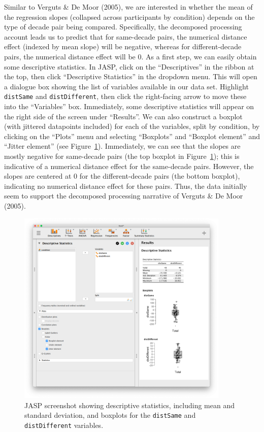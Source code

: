 \documentclass[english,,doc,floatsintext]{apa6}
\begin{document}
Similar to Verguts \& De Moor (2005), we are interested in whether the mean of the regression slopes (collapsed across participants by condition) depends on the type of decade pair being compared. Specifically, the decomposed processing account leads us to predict that for same-decade pairs, the numerical distance effect (indexed by mean slope) will be negative, whereas for different-decade pairs, the numerical distance effect will be 0. As a first step, we can easily obtain some descriptive statistics. In JASP, click on the \enquote{Descriptives} in the ribbon at the top, then click \enquote{Descriptive Statistics} in the dropdown menu. This will open a dialogue box showing the list of variables available in our data set. Highlight \texttt{distSame} and \texttt{distDifferent}, then click the right-facing arrow to move these into the \enquote{Variables} box. Immediately, some descriptive statistics will appear on the right side of the screen under \enquote{Results}. We can also construct a boxplot (with jittered datapoints included) for each of the variables, split by condition, by clicking on the \enquote{Plots} menu and selecting \enquote{Boxplots} and \enquote{Boxplot element} and \enquote{Jitter element} (see Figure~\ref{fig:ttestDescriptives}). Immediately, we can see that the slopes are mostly negative for same-decade pairs (the top boxplot in Figure~\ref{fig:ttestDescriptives}); this is indicative of a numerical distance effect for the same-decade pairs. However, the slopes are centered at 0 for the different-decade pairs (the bottom boxplot), indicating no numerical distance effect for these pairs. Thus, the data initially seem to support the decomposed processing narrative of Verguts \& De Moor (2005).

\begin{figure}[htbp]
\centering
\includegraphics[width=0.9\textwidth,height=\textheight]{figures/ttestDescriptives.png}
\caption{\label{fig:ttestDescriptives}JASP screenshot showing descriptive statistics, including mean and standard deviation, and boxplots for the \texttt{distSame} and \texttt{distDifferent} variables.}
\end{figure}
\end{document}

